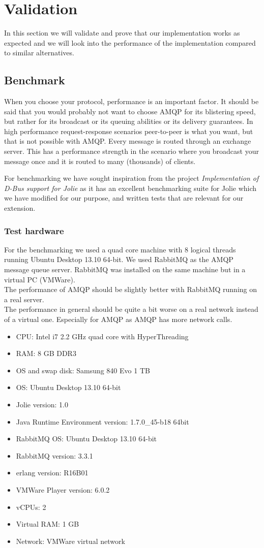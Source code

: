 \section{Validation}
In this section we will validate and prove that our implementation works as expected and we will look into the performance of the implementation compared to similar alternatives.
\subsection{Benchmark}
When you choose your protocol, performance is an important factor. It should be said that you would probably not want to choose AMQP for its blistering speed, but rather for its broadcast or its queuing abilities or its delivery guarantees. In high performance request-response scenarios peer-to-peer is what you want, but that is not possible with AMQP. Every message is routed through an exchange server. This has a performance strength in the scenario where you broadcast your message once and it is routed to many (thousands) of clients.

For benchmarking we have sought inspiration from the project \textit{Implementation of D-Bus support for Jolie}\cite{D-Bus} as it has an excellent benchmarking suite for Jolie which we have modified for our purpose, and written tests that are relevant for our extension.
\subsubsection{Test hardware}
For the benchmarking we used a quad core machine with 8 logical threads running Ubuntu Desktop 13.10 64-bit. We used RabbitMQ as the AMQP message queue server. RabbitMQ was installed on the same machine but in a virtual PC (VMWare).\\
The performance of AMQP should be slightly better with RabbitMQ running on a real server.\\
The performance in general should be quite a bit worse on a real network instead of a virtual one. Especially for AMQP as AMQP has more network calls.
\begin{itemize}
\item CPU: Intel i7 2.2 GHz quad core with HyperThreading
\item RAM: 8 GB DDR3
\item OS and swap disk: Samsung 840 Evo 1 TB
\item OS: Ubuntu Desktop 13.10 64-bit
\item Jolie version: 1.0
\item Java Runtime Environment version: 1.7.0\_45-b18 64bit
\item RabbitMQ OS: Ubuntu Desktop 13.10 64-bit
\item RabbitMQ version: 3.3.1
\item erlang version: R16B01
\item VMWare Player version: 6.0.2
\item vCPUs: 2
\item Virtual RAM: 1 GB
\item Network: VMWare virtual network
\end{itemize}
